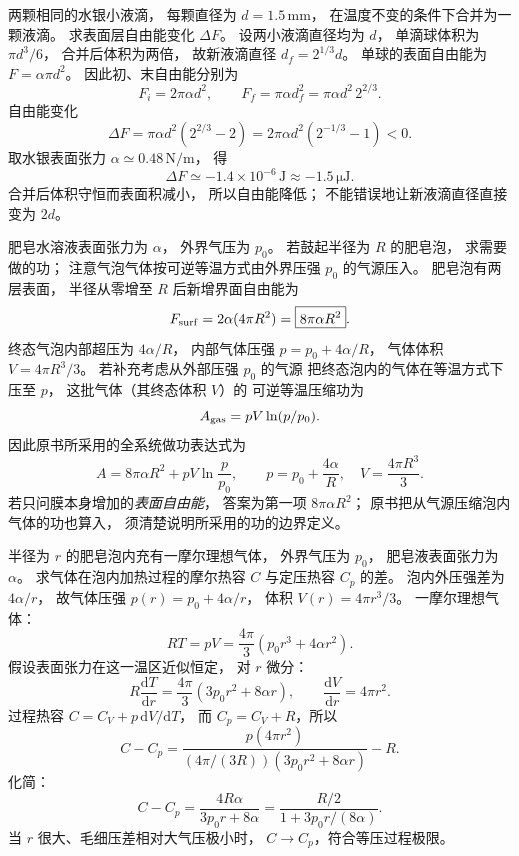 两颗相同的水银小液滴，
每颗直径为 $d=1.5\,\mathrm{mm}$，
在温度不变的条件下合并为一颗液滴。
求表面层自由能变化 $\Delta F$。
\exsolution
设两小液滴直径均为 $d$，
单滴球体积为
$\pi d^3/6$，
合并后体积为两倍，
故新液滴直径
$d_f=2^{1/3}d$。
单球的表面自由能为
$F=\alpha\pi d^2$。
因此初、末自由能分别为
\[
F_i=2\pi\alpha d^2,\qquad
F_f=\pi\alpha d_f^2
=\pi\alpha d^2\,2^{2/3}.
\]
自由能变化
\[
\boxed{\Delta F=\pi\alpha d^2(2^{2/3}-2)
=2\pi\alpha d^2(2^{-1/3}-1)<0}.
\]
取水银表面张力
$\alpha\simeq0.48\,\mathrm{N/m}$，
得
\[
\boxed{\Delta F\simeq-1.4\times10^{-6}\,\mathrm J
\approx-1.5\,\mathrm{\mu J}}.
\]
\excheck 合并后体积守恒而表面积减小，
所以自由能降低；
不能错误地让新液滴直径直接变为 $2d$。

肥皂水溶液表面张力为 $\alpha$，
外界气压为 $p_0$。
若鼓起半径为 $R$ 的肥皂泡，
求需要做的功；
注意气泡气体按可逆等温方式由外界压强
$p_0$ 的气源压入。
\exsolution
肥皂泡有两层表面，
半径从零增至 $R$ 后新增界面自由能为
\[
F_{\rm surf}=2\alpha(4\pi R^2)
=\boxed{8\pi\alpha R^2}.
\]
终态气泡内部超压为
$4\alpha/R$，
内部气体压强
$p=p_0+4\alpha/R$，
气体体积
$V=4\pi R^3/3$。
若补充考虑从外部压强 $p_0$ 的气源
把终态泡内的气体在等温方式下压至 $p$，
这批气体（其终态体积 $V$）的
可逆等温压缩功为
\[
A_{\rm gas}=pV\ln(p/p_0).
\]
因此原书所采用的全系统做功表达式为
\[
\boxed{A=8\pi\alpha R^2+
pV\ln\frac{p}{p_0}},\qquad
p=p_0+\frac{4\alpha}{R},\quad
V=\frac{4\pi R^3}{3}.
\]
\excheck 若只问膜本身增加的\emph{表面自由能}，
答案为第一项 $8\pi\alpha R^2$；
原书把从气源压缩泡内气体的功也算入，
须清楚说明所采用的功的边界定义。

半径为 $r$ 的肥皂泡内充有一摩尔理想气体，
外界气压为 $p_0$，
肥皂液表面张力为 $\alpha$。
求气体在泡内加热过程的摩尔热容 $C$
与定压热容 $C_p$ 的差。
\exsolution
泡内外压强差为
$4\alpha/r$，
故气体压强
$p(r)=p_0+4\alpha/r$，
体积
$V(r)=4\pi r^3/3$。
一摩尔理想气体：
\[
RT=pV=\frac{4\pi}{3}(p_0r^3+4\alpha r^2).
\]
假设表面张力在这一温区近似恒定，
对 $r$ 微分：
\[
R\frac{\mathrm dT}{\mathrm dr}
=\frac{4\pi}{3}(3p_0r^2+8\alpha r),
\qquad
\frac{\mathrm dV}{\mathrm dr}=4\pi r^2.
\]
过程热容
$C=C_V+p\,\mathrm dV/\mathrm dT$，
而 $C_p=C_V+R$，所以
\[
C-C_p
=\frac{p(4\pi r^2)}
{(4\pi/(3R))(3p_0r^2+8\alpha r)}-R.
\]
化简：
\[
\boxed{C-C_p=
\frac{4R\alpha}{3p_0r+8\alpha}
=\frac{R/2}{1+3p_0r/(8\alpha)}}.
\]
\excheck 当 $r$ 很大、毛细压差相对大气压极小时，
$C\to C_p$，符合等压过程极限。

